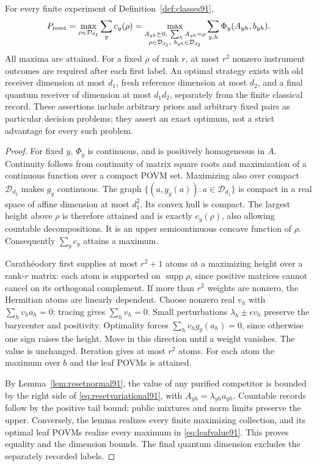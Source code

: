 \begin{theorem}\label{thm:resetvariational91}
For every finite experiment of Definition~\ref{def:classes91},
\begin{equation}\label{eq:resetvariational91}
 P_{\rm reset}=\max_{\rho\in\mathcal D_{d_1}}\sum_yc_y(\rho)
 =\max_{\substack{A_{yh}\succeq0,\ \sum_hA_{yh}=\rho\\
                    \rho\in\mathcal D_{d_1},\ b_{yh}\in\mathcal D_{d_2}}}
                    \sum_{y,h}\Phi_y(A_{yh},b_{yh}).
\end{equation}
All maxima are attained.  For a fixed $\rho$ of rank $r$, at most $r^2$
nonzero instrument outcomes are required after each first label.
An optimal strategy exists with old receiver dimension at most $d_1$,
fresh reference dimension at most $d_2$, and a final quantum receiver
of dimension at most $d_1d_2$, separately from the finite classical
record.  These assertions include arbitrary priors and arbitrary fixed
pairs as particular decision problems; they assert an exact optimum,
not a strict advantage for every such problem.
\end{theorem}
\begin{proof}
For fixed $y$, $\Phi_y$ is continuous, and is positively homogeneous
in $A$.  Continuity follows from continuity of matrix square roots and
maximization of a continuous function over a compact POVM set.
Maximizing also over compact $\mathcal D_{d_2}$ makes $g_y$ continuous.
The graph $\{(a,g_y(a)):a\in\mathcal D_{d_1}\}$ is compact in a
real space of affine dimension at most $d_1^2$.  Its convex hull is
compact.  The largest height above $\rho$ is therefore attained and
is exactly $c_y(\rho)$, also allowing countable decompositions.
It is an upper semicontinuous concave function of $\rho$.
Consequently $\sum_yc_y$ attains a maximum.

Carath\'eodory first supplies at most $r^2+1$ atoms at a maximizing
height over a rank-$r$ matrix: each atom is supported on
$\operatorname{supp}\rho$, since positive matrices cannot cancel on its
orthogonal complement.  If more than $r^2$ weights are nonzero, the
Hermitian atoms are linearly dependent.  Choose nonzero real $v_h$ with
$\sum_hv_ha_h=0$; tracing gives $\sum_hv_h=0$.
Small perturbations $\lambda_h\pm\epsilon v_h$ preserve the barycenter
and positivity.  Optimality forces $\sum_hv_hg_y(a_h)=0$, since otherwise
one sign raises the height.  Move in this direction until a weight
vanishes.  The value is unchanged.  Iteration gives at most $r^2$ atoms.
For each atom the maximum over $b$ and the leaf POVMs is attained.

By Lemma~\ref{lem:resetnormal91}, the value of any purified competitor
is bounded by the right side of \eqref{eq:resetvariational91}, with
$A_{yh}=\lambda_{yh}a_{yh}$.  Countable records follow by the positive
tail bound; public mixtures and norm limits preserve the upper.
Conversely, the lemma realizes every finite maximizing collection,
and its optimal leaf POVMs realize every maximum in
\eqref{eq:leafvalue91}.  This proves equality and the dimension bounds.
The final quantum dimension excludes the separately recorded labels.
\end{proof}
